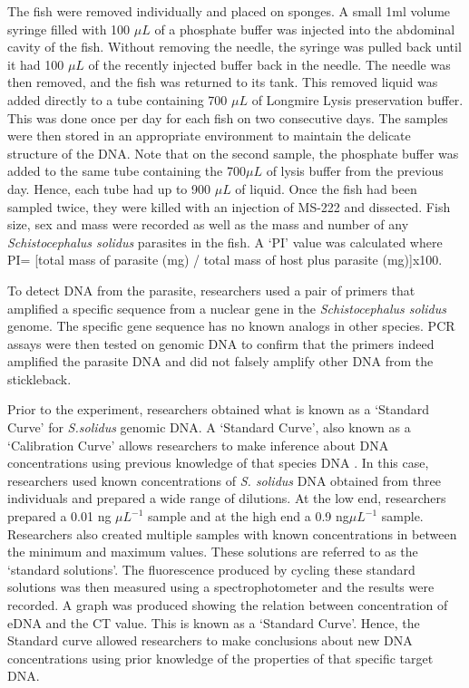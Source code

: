 \vspace{5mm}

The fish were removed individually and placed on sponges. A small 1ml volume syringe filled with 100 $\mu L$ of a phosphate buffer was injected into the abdominal cavity of the fish. Without removing the needle, the syringe was pulled back until it had 100  $\mu L$ of the recently injected buffer back in the needle. The needle was then removed, and the fish was returned to its tank. This removed liquid was added directly to a tube containing 700 $\mu L$ of  Longmire Lysis preservation buffer. This was done once per day for each fish on two consecutive days. The samples were then stored in an appropriate environment to maintain the delicate structure of the DNA. Note that on the second sample, the phosphate buffer was added to the same tube containing the 700$ \mu L$ of lysis buffer from the previous day. Hence, each tube had up to 900 $\mu L$ of liquid.
Once the fish had been sampled twice, they were killed with an injection of MS-222 and dissected. Fish size, sex and mass were recorded as well as the mass and number of any  \textit{Schistocephalus solidus} parasites in the fish. A `PI' value was calculated where PI= [total mass of parasite (mg) / total mass of host plus parasite (mg)]x100.


\vspace{5mm}

To detect DNA from the parasite, researchers used a pair of primers that amplified a specific sequence from a nuclear gene in the \textit{Schistocephalus solidus} genome. The specific gene sequence has no known analogs in other species. PCR assays were then tested on genomic DNA to confirm that the primers indeed amplified the parasite DNA and did not falsely amplify other DNA from the stickleback.

\vspace{6mm}

Prior to the experiment, researchers obtained what is known as a `Standard Curve' for \textit{S.solidus} genomic DNA. A `Standard Curve', also known as a `Calibration Curve' allows researchers to make inference about DNA concentrations using previous knowledge of that species DNA \citep{standardCurve}. In this case, researchers used known concentrations of \textit{S. solidus} DNA obtained from three individuals and prepared a wide range of dilutions. At the low end, researchers prepared a 0.01 ng $\mu L^{-1}$ sample and at the high end a 0.9 ng$ \mu L^{-1}$ sample. Researchers also created multiple samples with known concentrations in between the minimum and maximum values. These solutions are referred to as the `standard solutions'.  The fluorescence produced by cycling these standard solutions was then measured using a spectrophotometer and the results were recorded. A graph was produced showing the relation between concentration of eDNA and the CT value. This is known as a `Standard Curve'.  Hence, the Standard curve allowed researchers to make conclusions about new DNA concentrations using prior knowledge of the properties of that specific target DNA. 

